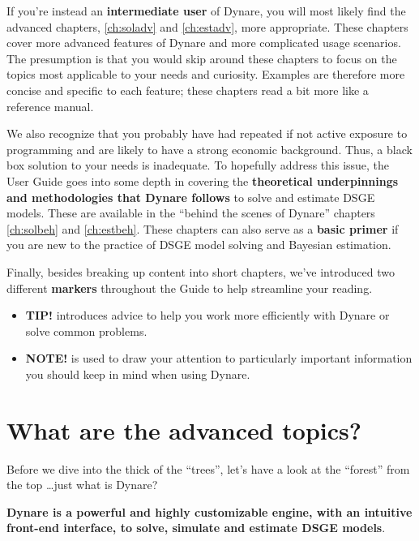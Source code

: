 \documentclass[10pt,math=newtx,citestyle=gb7714-2015,bibstyle=gb7714-2015]{elegantbook}
\begin{document}
	If you're instead an \textbf{intermediate user} of Dynare, you will most likely find the advanced chapters, \ref{ch:soladv} and \ref{ch:estadv}, more appropriate. These chapters cover more advanced features of Dynare and more complicated usage scenarios. The presumption is that you would skip around these chapters to focus on the topics most applicable to your needs and curiosity. Examples are therefore more concise and specific to each feature; these chapters read a bit more like a reference manual.
	
	We also recognize that you probably have had repeated if not active exposure to programming and are likely to have a strong economic background. Thus, a black box solution to your needs is inadequate. To hopefully address this issue, the User Guide goes into some depth in covering the \textbf{theoretical underpinnings and methodologies that Dynare follows} to solve and estimate DSGE models. These are available in the ``behind the scenes of Dynare'' chapters \ref{ch:solbeh} and \ref{ch:estbeh}. These chapters can also serve as a \textbf{basic primer} if you are new to the practice of DSGE model solving and Bayesian estimation. 
	
	Finally, besides breaking up content into short chapters, we've introduced two different \textbf{markers} throughout the Guide to help streamline your reading.
	\begin{itemize}
		\item \textbf{\textsf{TIP!}} introduces advice to help you work more efficiently with Dynare or solve common problems.
		\item \textbf{\textsf{NOTE!}} is used to draw your attention to particularly important information you should keep in mind when using Dynare.
	\end{itemize}
	
	
	\section{What are the advanced topics?}
	Before we dive into the thick of the ``trees'', let's have a look at the ``forest'' from the top \ldots just what is Dynare? 
	
	\textbf{Dynare is a powerful and highly customizable engine, with an intuitive front-end interface, to solve, simulate and estimate DSGE models}. 
	
\end{document}
